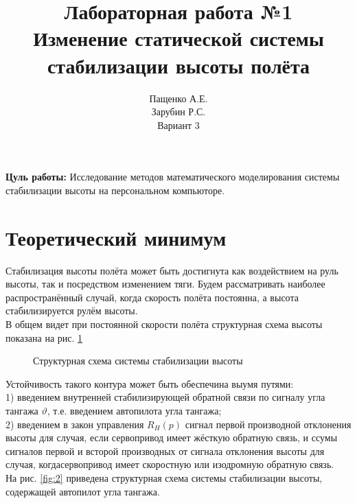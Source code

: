 \documentclass[a4paper,12pt]{article}
\title{\textbf{Лабораторная работа №1}\\ Изменение статической системы 
        стабилизации высоты полёта}
\author{Пащенко А.Е.\\Зарубин Р.С.\\Вариант 3}
\date{}
\begin{document}
 

\maketitle %
\textbf{Цуль работы:} Исследование методов математического моделирования системы стабилизации высоты на персональном компьюторе.
\section{Теоретический минимум}
Стабилизация высоты полёта может быть достигнута как воздействием на руль высоты, так и посредством изменением тяги. Будем рассматривать наиболее распространённый случай, 
когда скорость полёта постоянна, а высота стабилизируется рулём высоты.\\
В общем видет при постоянной скорости полёта структурная схема высоты показана 
на рис. \ref{fig:1}

\begin{figure}[H]
    \caption{Структурная схема системы стабилизации высоты}
    \label{fig:1}
\end{figure}
 
Устойчивость такого контура может быть обеспечина выумя путями: \\ 

1) введением внутренней стабилизирующей обратной связи по сигналу угла тангажа 
$\vartheta$, т.е. введением автопилота угла тангажа;\\

2) введением в закон управления $R_{H}(p)$ сигнал первой производной отклонения высоты для случая, если сервопривод имеет жёсткую обратную связь,
и ссумы сигналов первой и всторой производных от сигнала отклонения высоты для случая, 
когдасервопривод имеет скоростную или изодромную обратную связь.\\

На рис. \ref{fig:2} приведена структурная схема системы стабилизации высоты, содержащей автопилот угла тангажа.
\end{document}
